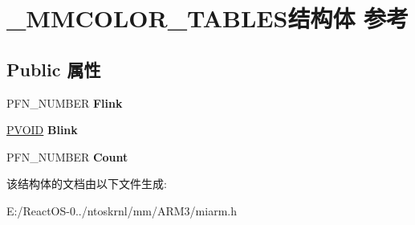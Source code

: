 \hypertarget{struct___m_m_c_o_l_o_r___t_a_b_l_e_s}{}\section{\+\_\+\+M\+M\+C\+O\+L\+O\+R\+\_\+\+T\+A\+B\+L\+E\+S结构体 参考}
\label{struct___m_m_c_o_l_o_r___t_a_b_l_e_s}
\subsection*{Public 属性}
\begin{DoxyCompactItemize}
\item 
\mbox{\label{struct___m_m_c_o_l_o_r___t_a_b_l_e_s_a8574b1f120bf02d98bcd5d9bb471be25}} 
P\+F\+N\+\_\+\+N\+U\+M\+B\+ER {\bfseries Flink}
\item 
\mbox{\label{struct___m_m_c_o_l_o_r___t_a_b_l_e_s_a1cca9351f09eb86b6abcb2f2bee1d731}} 
\hyperlink{interfacevoid}{P\+V\+O\+ID} {\bfseries Blink}
\item 
\mbox{\label{struct___m_m_c_o_l_o_r___t_a_b_l_e_s_a0b5c933567c691a15fb408d0ba3395dc}} 
P\+F\+N\+\_\+\+N\+U\+M\+B\+ER {\bfseries Count}
\end{DoxyCompactItemize}


该结构体的文档由以下文件生成\+:\begin{DoxyCompactItemize}
\item 
E\+:/\+React\+O\+S-\/0../ntoskrnl/mm/\+A\+R\+M3/miarm.\+h\end{DoxyCompactItemize}
